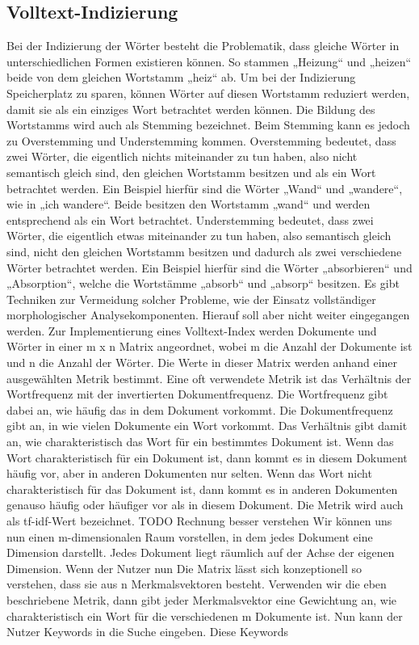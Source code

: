 \subsection*{Volltext-Indizierung}
Bei der Indizierung der Wörter besteht die Problematik, dass gleiche Wörter in unterschiedlichen Formen existieren können.
So stammen „Heizung“ und „heizen“ beide von dem gleichen Wortstamm „heiz“ ab.
Um bei der Indizierung Speicherplatz zu sparen, können Wörter auf diesen Wortstamm reduziert werden, damit sie als ein einziges Wort betrachtet werden können.
Die Bildung des Wortstamms wird auch als Stemming bezeichnet.
Beim Stemming kann es jedoch zu Overstemming und Understemming kommen.
Overstemming bedeutet, dass zwei Wörter, die eigentlich nichts miteinander zu tun haben, also nicht semantisch gleich sind, den gleichen Wortstamm besitzen und als ein Wort betrachtet werden.
Ein Beispiel hierfür sind die Wörter „Wand“ und „wandere“, wie in „ich wandere“.
Beide besitzen den Wortstamm „wand“ und werden entsprechend als ein Wort betrachtet.
Understemming bedeutet, dass zwei Wörter, die eigentlich etwas miteinander zu tun haben, also semantisch gleich sind, nicht den gleichen Wortstamm besitzen und dadurch als zwei verschiedene Wörter betrachtet werden.
Ein Beispiel hierfür sind die Wörter „absorbieren“ und „Absorption“, welche die Wortstämme „absorb“ und „absorp“ besitzen.
Es gibt Techniken zur Vermeidung solcher Probleme, wie der Einsatz vollständiger morphologischer Analysekomponenten.
Hierauf soll aber nicht weiter eingegangen werden.
Zur Implementierung eines Volltext-Index werden Dokumente und Wörter in einer m x n Matrix angeordnet, wobei m die Anzahl der Dokumente ist und n die Anzahl der Wörter.
Die Werte in dieser Matrix werden anhand einer ausgewählten Metrik bestimmt.
Eine oft verwendete Metrik ist das Verhältnis der Wortfrequenz mit der invertierten Dokumentfrequenz.
Die Wortfrequenz gibt dabei an, wie häufig das in dem Dokument vorkommt.
Die Dokumentfrequenz gibt an, in wie vielen Dokumente ein Wort vorkommt.
Das Verhältnis gibt damit an, wie charakteristisch das Wort für ein bestimmtes Dokument ist.
Wenn das Wort charakteristisch für ein Dokument ist, dann kommt es in diesem Dokument häufig vor, aber in anderen Dokumenten nur selten.
Wenn das Wort nicht charakteristisch für das Dokument ist, dann kommt es in anderen Dokumenten genauso häufig oder häufiger vor als in diesem Dokument.
Die Metrik wird auch als tf-idf-Wert bezeichnet.
TODO Rechnung besser verstehen
Wir können uns nun einen m-dimensionalen Raum vorstellen, in dem jedes Dokument eine Dimension darstellt.
Jedes Dokument liegt räumlich auf der Achse der eigenen Dimension.
Wenn der Nutzer nun 
Die Matrix lässt sich konzeptionell so verstehen, dass sie aus n Merkmalsvektoren besteht.
Verwenden wir die eben beschriebene Metrik, dann gibt jeder Merkmalsvektor eine Gewichtung an, wie charakteristisch ein Wort für die verschiedenen m Dokumente ist.
Nun kann der Nutzer Keywords in die Suche eingeben.
Diese Keywords 

